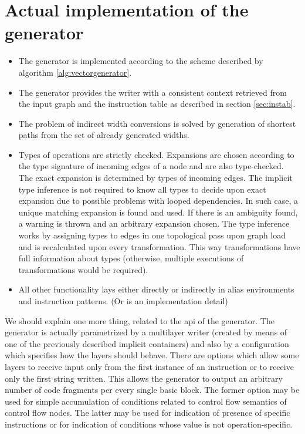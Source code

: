 \section{Actual implementation of the generator}

\begin{itemize}
  \item The generator is implemented according to the scheme described by algorithm \ref{alg:vectorgenerator}.  
  \item The generator provides the writer with a consistent context retrieved from the input graph and the instruction table as described in section \ref{sec:instab}. 
  \item The problem of indirect width conversions is solved by generation of shortest paths from the set of already generated widths. 
  \item Types of operations are strictly checked. Expansions are chosen according to the type signature of incoming edges of a node and are also type-checked. The exact expansion is determined by types of incoming edges. The implicit type inference is not required to know all types to decide upon exact expansion due to possible problems with looped dependencies. In such case, a unique matching expansion is found and used. If there is an ambiguity found, a warning is thrown and an arbitrary expansion chosen. The type inference works by assigning types to edges in one topological pass upon graph load and is recalculated upon every transformation. This way transformations have full information about types (otherwise, multiple executions of transformations would be required). 
  \item All other functionality lays either directly or indirectly in alias environments and instruction patterns. (Or is an implementation detail)
\end{itemize}

We should explain one more thing, related to the api of the generator. The generator is actually parametrized by a multilayer writer (created by means of one of the previously described implicit containers) and also by a configuration which specifies how the layers should behave. There are options which allow some layers to receive input only from the first instance of an instruction or to receive only the first string written. This allows the generator to output an arbitrary number of code fragments per every single basic block. The former option may be used for simple accumulation of conditions related to control flow semantics of control flow nodes. The latter may be used for indication of presence of specific instructions or for indication of conditions whose value is not operation-specific.





